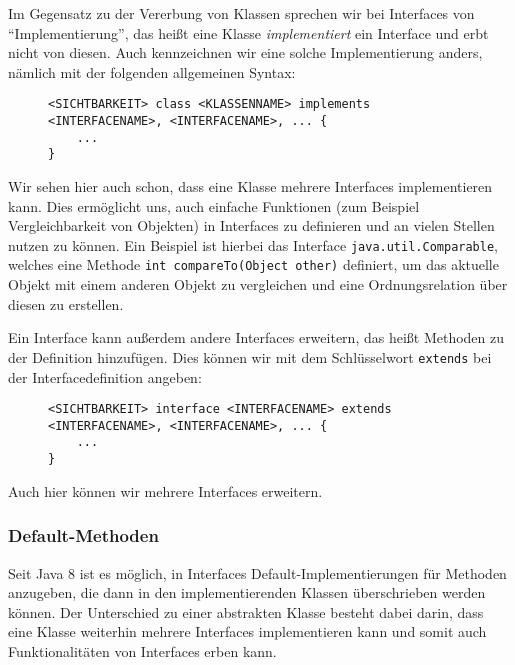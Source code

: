 	Im Gegensatz zu der Vererbung von Klassen sprechen wir bei Interfaces von \enquote{Implementierung}, das heißt eine Klasse \textit{implementiert} ein Interface und erbt nicht von diesen. Auch kennzeichnen wir eine solche Implementierung anders, nämlich mit der folgenden allgemeinen Syntax:
	\begin{figure}[H]
		\centering
		\begin{lstlisting}
<SICHTBARKEIT> class <KLASSENNAME> implements <INTERFACENAME>, <INTERFACENAME>, ... {
	...
}
\end{lstlisting}
	\end{figure}
	Wir sehen hier auch schon, dass eine Klasse mehrere Interfaces implementieren kann. Dies ermöglicht uns, auch einfache Funktionen (zum Beispiel Vergleichbarkeit von Objekten) in Interfaces zu definieren und an vielen Stellen nutzen zu können. Ein Beispiel ist hierbei das Interface \lstinline|java.util.Comparable|, welches eine Methode \lstinline|int compareTo(Object other)| definiert, um das aktuelle Objekt mit einem anderen Objekt zu vergleichen und eine Ordnungsrelation über diesen zu erstellen.
	
	Ein Interface kann außerdem andere Interfaces erweitern, das heißt Methoden zu der Definition hinzufügen. Dies können wir mit dem Schlüsselwort \lstinline|extends| bei der Interfacedefinition angeben:
	\begin{figure}[H]
		\centering
		\begin{lstlisting}
<SICHTBARKEIT> interface <INTERFACENAME> extends <INTERFACENAME>, <INTERFACENAME>, ... {
	...
}
\end{lstlisting}
	\end{figure}
	Auch hier können wir mehrere Interfaces erweitern.
	
	\subsubsection{Default-Methoden}
		Seit Java 8 ist es möglich, in Interfaces Default-Implementierungen für Methoden anzugeben, die dann in den implementierenden Klassen überschrieben werden können. Der Unterschied zu einer abstrakten Klasse besteht dabei darin, dass eine Klasse weiterhin mehrere Interfaces implementieren kann und somit auch Funktionalitäten von Interfaces erben kann.
		
